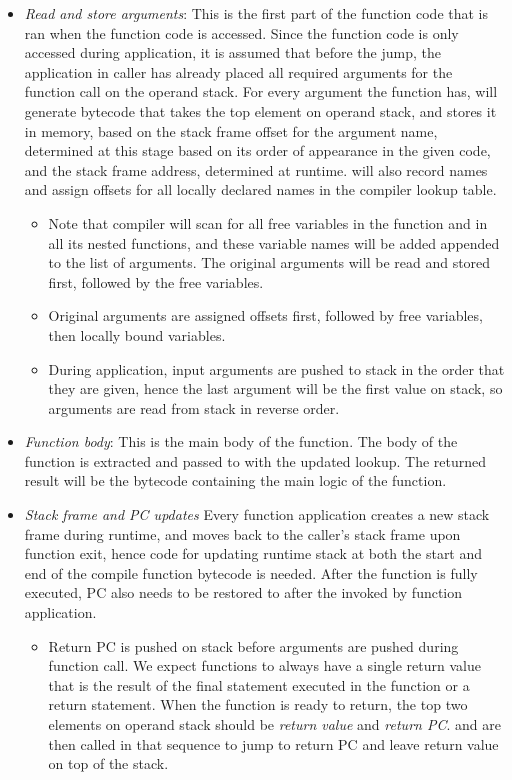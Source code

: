 \begin{itemize}
    \item \textit{Read and store arguments}: This is the first part of the function code that is ran when the function code is accessed. Since the function code is only accessed during application, it is assumed that before the jump, the application in caller has already placed all required arguments for the function call on the operand stack. For every argument the function has,  will generate bytecode that takes the top element on operand stack, and stores it in memory, based on the stack frame offset for the argument name, determined at this stage based on its order of appearance in the given code, and the stack frame address, determined at runtime.  will also record names and assign offsets for all locally declared names in the compiler lookup table. 
    \begin{itemize}
        \item Note that compiler will scan for all free variables in the function and in all its nested functions, and these variable names will be added appended to the list of arguments. The original arguments will be read and stored first, followed by the free variables. 
        \item Original arguments are assigned offsets first, followed by free variables, then locally bound variables. 
        \item During application, input arguments are pushed to stack in the order that they are given, hence the last argument will be the first value on stack, so arguments are read from stack in reverse order. 
    \end{itemize}
    \item \textit{Function body}: This is the main body of the function. The body of the function is extracted and passed to  with the updated lookup. The returned result will be the bytecode containing the main logic of the function. 
    \item \textit{Stack frame and PC updates} Every function application creates a new stack frame during runtime, and moves back to the caller's stack frame upon function exit, hence code for updating runtime stack at both the start and end of the compile function bytecode is needed. After the function is fully executed, PC also needs to be restored to after the  invoked by function application. 
        \begin{itemize}
            \item Return PC is pushed on stack before arguments are pushed during function call. We expect functions to always have a single return value that is the result of the final statement executed in the function or a return statement. When the function is ready to return, the top two elements on operand stack should be \textit{return value} and \textit{return PC}.  and  are then called in that sequence to jump to return PC and leave return value on top of the stack.

\end{itemize}
\end{itemize}
